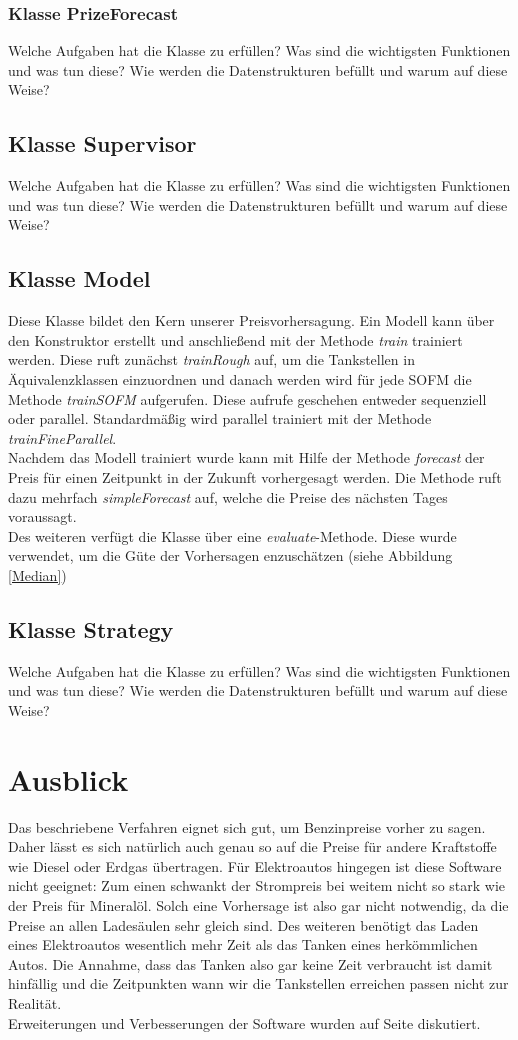 \documentclass[11pt]{article}
\begin{document}
\subsubsection{Klasse PrizeForecast}
	Welche Aufgaben hat die Klasse zu erfüllen? Was sind die wichtigsten Funktionen und was tun diese? Wie werden die Datenstrukturen befüllt und warum auf diese Weise?
\subsection{Klasse Supervisor}
	Welche Aufgaben hat die Klasse zu erfüllen? Was sind die wichtigsten Funktionen und was tun diese? Wie werden die Datenstrukturen befüllt und warum auf diese Weise?
\subsection{Klasse Model}
	Diese Klasse bildet den Kern unserer Preisvorhersagung. Ein Modell kann über den Konstruktor erstellt und anschließend mit der Methode \textit{train} trainiert werden. Diese ruft zunächst \textit{trainRough} auf, um die Tankstellen in Äquivalenzklassen einzuordnen und danach werden wird für jede SOFM die Methode \textit{trainSOFM} aufgerufen. Diese aufrufe geschehen entweder sequenziell oder parallel. Standardmäßig wird parallel trainiert mit der Methode \textit{trainFineParallel}.\\
	Nachdem das Modell trainiert wurde kann mit Hilfe der Methode \textit{forecast} der Preis für einen Zeitpunkt in der Zukunft vorhergesagt werden. Die Methode ruft dazu mehrfach \textit{simpleForecast} auf, welche die Preise des nächsten Tages voraussagt.\\
	Des weiteren verfügt die Klasse über eine \textit{evaluate}-Methode. Diese wurde verwendet, um die Güte der Vorhersagen enzuschätzen (siehe Abbildung \ref{Median})
\subsection{Klasse Strategy}
	Welche Aufgaben hat die Klasse zu erfüllen? Was sind die wichtigsten Funktionen und was tun diese? Wie werden die Datenstrukturen befüllt und warum auf diese Weise?

\section{Ausblick}
	Das beschriebene Verfahren eignet sich gut, um Benzinpreise vorher zu sagen. Daher lässt es sich natürlich auch genau so auf die Preise für andere Kraftstoffe wie Diesel oder Erdgas übertragen. Für Elektroautos hingegen ist diese Software nicht geeignet: Zum einen schwankt der Strompreis bei weitem nicht so stark wie der Preis für Mineralöl. Solch eine Vorhersage ist also gar nicht notwendig, da die Preise an allen Ladesäulen sehr gleich sind. Des weiteren benötigt das Laden eines Elektroautos wesentlich mehr Zeit als das Tanken eines herkömmlichen Autos. Die Annahme, dass das Tanken also gar keine Zeit verbraucht ist damit hinfällig und die Zeitpunkten wann wir die Tankstellen erreichen passen nicht zur Realität.\\
	Erweiterungen und Verbesserungen der Software wurden auf Seite \pageref{potential} diskutiert.
	
\end{document}
